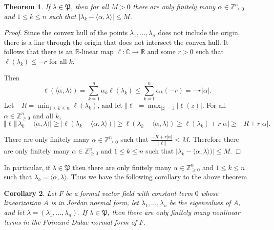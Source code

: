 \documentclass{article}
\newtheorem{theorem}{Theorem}
\newtheorem{corollary}[theorem]{Corollary}
\newcommand{\norm}[1]{\Vert #1 \Vert}
\begin{document}
\begin{theorem}
If $\lambda \in \mathfrak{P}$, then for all $M>0$ there are  only finitely many $\alpha \in \mathbb{Z}^n_{\geq 0}$
and $1 \leq k \leq n$ such that $|\lambda_k-\langle \alpha,\lambda \rangle| \leq M$.  
\end{theorem}
\begin{proof}
Since the convex hull of the points $\lambda_1,\ldots,\lambda_n$ does not include the origin,
there is a line through the origin that does not intersect the convex hull. It follows that there is
an $\mathbb{R}$-linear map $\ell:\mathbb{C} \to \mathbb{R}$ and some $r>0$ such that 
$\ell(\lambda_k) \leq -r$ for all $k$. 

Then
\[
\ell(\langle \alpha, \lambda \rangle)=\sum_{k=1}^n \alpha_k \ell(\lambda_k) \leq 
\sum_{k=1}^n \alpha_k (-r) = -r|\alpha|.
\]
Let $-R=\min_{1 \leq k \leq n} \ell(\lambda_k)$, and let
$\norm{\ell}=\max_{|z|=1} |\ell(z)|$. For all $\alpha \in \mathbb{Z}^n_{\geq 0}$ and all
$k$,
\[
\norm{\ell}|\lambda_k-\langle \alpha,\lambda \rangle| \geq |\ell(\lambda_k-\langle \alpha,\lambda \rangle)| \geq \ell(\lambda_k-\langle \alpha,\lambda \rangle) \geq \ell(\lambda_k)+r|\alpha| \geq -R+r|\alpha|.  
\]


There are only finitely many $\alpha \in \mathbb{Z}^n_{\geq 0}$ such that
$\frac{-R+r|\alpha|}{\norm{\ell}} \leq M$. Therefore there are only finitely many $\alpha \in \mathbb{Z}^n_{\geq 0}$
and $1 \leq k \leq n$ such that
$|\lambda_k-\langle \alpha,\lambda \rangle)| \leq M$.
\end{proof}

In particular, if $\lambda \in \mathfrak{P}$ then  there are only finitely many $\alpha \in \mathbb{Z}^n_{\geq 0}$
and $1 \leq k \leq n$
such that $\lambda_k=\langle \alpha,\lambda \rangle$. Thus we have the following
corollary to the above theorem.

\begin{corollary}
Let $F$ be a formal vector field with constant term $0$ whose linearization $A$ is in Jordan normal form, let $\lambda_1,\ldots,\lambda_n$ be the eigenvalues of $A$, and let $\lambda=(\lambda_1,\ldots,\lambda_n)$. If $\lambda \in \mathfrak{P}$, then there are only finitely many nonlinear terms in the Poincar\'e-Dulac normal form of $F$.
\end{corollary}
\end{document}
